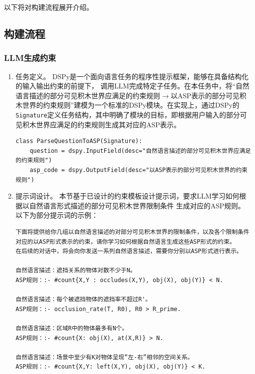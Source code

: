 以下将对构建流程展开介绍。
\subsection{构建流程}
\subsubsection{LLM生成约束}
\begin{enumerate}[nosep]
\item 任务定义。
DSPy是一个面向语言任务的程序性提示框架，能够在具备结构化的输入输出约束的前提下，
调用LLM完成特定子任务。在本任务中，将“自然语言描述的部分可见积木世界应满足的约束规则$\rightarrow$以ASP表示的部分可见积木世界的约束规则”建模为一个标准的DSPy模块。在实现上，通过DSPy的\texttt{Signature}定义任务结构，其中明确了模块的目标，即根据用户输入的部分可见积木世界应满足的约束规则生成其对应的ASP表示。
\begin{lstlisting}
class ParseQuestionToASP(Signature):
    question = dspy.InputField(desc="自然语言描述的部分可见积木世界应满足的约束规则")
    asp_code = dspy.OutputField(desc="以ASP表示的部分可见积木世界的约束规则")
\end{lstlisting}
\item 提示词设计。
本节基于已设计的约束模板设计提示词，要求LLM学习如何根据以自然语言形式描述的部分可见积木世界限制条件
生成对应的ASP规则。以下为部分提示词的示例：
\begin{lstlisting}
下面将提供给你几组以自然语言描述的对部分可见积木世界的限制条件，以及各个限制条件对应的以ASP形式表示的约束，请你学习如何根据自然语言生成这些ASP形式的约束。
在后续的对话中，将会向你发送一系列自然语言描述，需要你分别以ASP形式进行表示。

自然语言描述：遮挡关系的物体对数不少于N。
ASP规则：:- #count{X,Y : occludes(X,Y), obj(X), obj(Y)} < N.

自然语言描述：每个被遮挡物体的遮挡率不超过R'。
ASP规则：:- occlusion_rate(T, R0), R0 > R_prime.

自然语言描述：区域R中的物体最多有N个。
ASP规则：:- #count{X: obj(X), at(X,R)} > N.

自然语言描述：场景中至少有K对物体呈现“左-右”相邻的空间关系。
ASP规则：:- #count{X,Y: left(X,Y), obj(X), obj(Y)} < K.


\end{lstlisting}
\end{enumerate}
